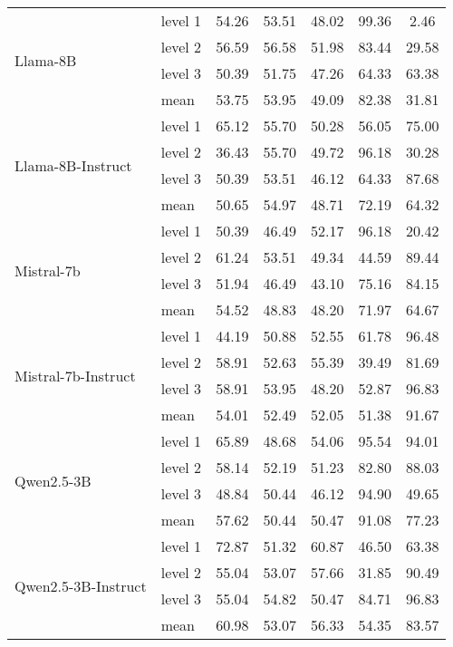\begin{table*}[h!]
\begin{tabular}{l|l|c|c|c|c|c}
 \multirow{4}{*}{Llama-8B} &  level 1 & 54.26 & 53.51 & 48.02 & 99.36 & 2.46 \\
& level 2 & 56.59 & 56.58 & 51.98 & 83.44 & 29.58 \\
&  level 3 & 50.39 & 51.75 & 47.26 & 64.33 & 63.38 \\
& mean & 53.75 & 53.95 & 49.09 & 82.38 & 31.81 \\
\hline
 \multirow{4}{*}{Llama-8B-Instruct} &  level 1 & 65.12 & 55.70 & 50.28 & 56.05 & 75.00 \\
& level 2 & 36.43 & 55.70 & 49.72 & 96.18 & 30.28 \\
&  level 3 & 50.39 & 53.51 & 46.12 & 64.33 & 87.68 \\
& mean & 50.65 & 54.97 & 48.71 & 72.19 & 64.32 \\
\hline


 \multirow{4}{*}{Mistral-7b} &  level 1 & 50.39 & 46.49 & 52.17 & 96.18 & 20.42 \\
& level 2 & 61.24 & 53.51 & 49.34 & 44.59 & 89.44 \\
&  level 3 & 51.94 & 46.49 & 43.10 & 75.16 & 84.15 \\
& mean & 54.52 & 48.83 & 48.20 & 71.97 & 64.67 \\
\hline
 \multirow{4}{*}{Mistral-7b-Instruct} &  level 1 & 44.19 & 50.88 & 52.55 & 61.78 & 96.48 \\
& level 2 & 58.91 & 52.63 & 55.39 & 39.49 & 81.69 \\
&  level 3 & 58.91 & 53.95 & 48.20 & 52.87 & 96.83 \\
& mean & 54.01 & 52.49 & 52.05 & 51.38 & 91.67 \\
\hline


 \multirow{4}{*}{Qwen2.5-3B} &  level 1 & 65.89 & 48.68 & 54.06 & 95.54 & 94.01 \\
& level 2 & 58.14 & 52.19 & 51.23 & 82.80 & 88.03 \\
&  level 3 & 48.84 & 50.44 & 46.12 & 94.90 & 49.65 \\
& mean & 57.62 & 50.44 & 50.47 & 91.08 & 77.23 \\
\hline

 \multirow{4}{*}{Qwen2.5-3B-Instruct} &  level 1 & 72.87 & 51.32 & 60.87 & 46.50 & 63.38 \\
& level 2 & 55.04 & 53.07 & 57.66 & 31.85 & 90.49 \\
&  level 3 & 55.04 & 54.82 & 50.47 & 84.71 & 96.83 \\
& mean & 60.98 & 53.07 & 56.33 & 54.35 & 83.57 \\
\hline



\end{tabular}
\end{table*}
